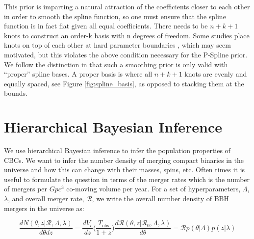
This prior is imparting a natural attraction of the coefficients closer to each other in order to smooth the spline function, so one 
must ensure that the spline function is in fact flat given all equal coefficients. There needs to be $n+k+1$ knots to construct an order-k 
basis with n degrees of freedom. Some studies place knots on top of each other at hard parameter boundaries \citep{deBoor78,monotone_regression_splines}, 
which may seem motivated, but this violates the above condition necessary for the P-Spline prior. We follow the distinction in \citet{eilers2021practical} 
that such a smoothing prior is only valid with ``proper'' spline bases. A proper basis is where all $n+k+1$ knots are evenly and equally spaced, 
see Figure \ref{fig:spline_basis}, as opposed to stacking them at the bounds.

\section{Hierarchical Bayesian Inference} \label{sec:hierarchical_inference}

We use hierarchical Bayesian inference to infer the population properties of CBCs. We want to infer the number density of merging compact binaries  
in the universe and how this can change with their masses, spins, etc. Often times it is useful to formulate the question in terms of the 
merger rates which is the number of mergers per $Gpc^{3}$ co-moving volume per year. For a set of hyperparameters, $\Lambda$, $\lambda$, and overall 
merger rate, $\mathcal{R}$, we write the overall number density of BBH mergers in the universe as: 

\begin{equation} \label{number_density}
     \frac{dN(\theta, z | \mathcal{R}, \Lambda, \lambda)}{d\theta dz} = \frac{dV_c}{dz}\bigg(\frac{T_\mathrm{obs}}{1+z}\bigg) \frac{d\mathcal{R}(\theta, z | \mathcal{R}_0, \Lambda, \lambda)}{d\theta} = \mathcal{R} p(\theta | \Lambda) p(z | \lambda)
\end{equation}

